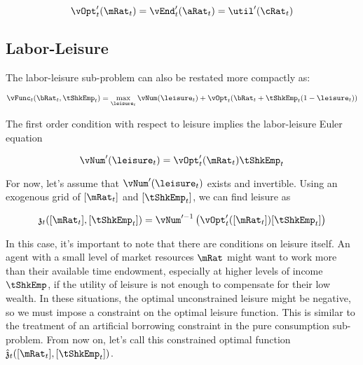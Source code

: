 \documentclass[\econtexRoot/EGMN]{subfiles}
\begin{document}
\begin{equation}
    \vOpt_{t}'(\mRat_{t}) = \vEnd_{t}'(\aRat_{t}) = \util'(\cRat_{t})
\end{equation}

\subsection{Labor-Leisure}

The labor-leisure sub-problem can also be restated more compactly as:

\begin{equation}
    \vFunc_{t}(\bRat_{t}, \tShkEmp_{t}) = \max_{ \leisure_{t}}
    \vNum(\leisure_{t}) + \vOpt_{t}(\bRat_{t} +
    \tShkEmp_{t}(1-\leisure_{t}))
\end{equation}

The first order condition with respect to leisure implies the labor-leisure Euler equation

\begin{equation}
    \vNum'(\leisure_{t}) =	\vOpt_{t}'(\mRat_{t}) \tShkEmp_{t}
\end{equation}

For now, let's assume that $\vNum'(\leisure_{t})$ exists and invertible. Using
an exogenous grid of $[\mRat_{t}]$ and $[\tShkEmp_{t}]$, we can find leisure as

\providecommand{\zEndFunc}{\ensuremath{\mathfrak{z}}}

\begin{equation}
    \zEndFunc_{t}([\mRat_{t}], [\tShkEmp_{t}]) = \vNum'^{-1}\left(
    \vOpt_{t}'([\mRat_{t}]) [\tShkEmp_{t}] \right)
\end{equation}

In this case, it's important to note that there are conditions on leisure itself. An agent with a small level of market resources $\mRat$ might want to work more than their available time endowment, especially at higher levels of income $\tShkEmp$, if the utility of leisure is not enough to compensate for their low wealth. In these situations, the optimal unconstrained leisure might be negative, so we must impose a constraint on the optimal leisure function. This is similar to the treatment of an artificial borrowing constraint in the pure consumption sub-problem. From now on, let's call this constrained optimal function $\hat{\zEndFunc}_{t}([\mRat_{t}], [\tShkEmp_{t}])$.

\providecommand{\lEndFunc}{\ensuremath{\mathfrak{l}}}
\providecommand{\bEndFunc}{\ensuremath{\mathfrak{b}}}
\end{document}
